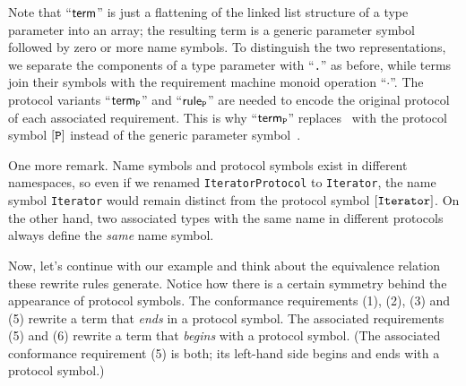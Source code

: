 \documentclass[../generics]{subfiles}
\begin{document}
\begin{example}
Note that ``$\mathsf{term}$'' is just a flattening of the linked list structure of a type parameter into an array; the resulting term is a generic parameter symbol followed by zero or more name symbols. To distinguish the two representations, we separate the components of a type parameter with ``\texttt{.}'' as before, while terms join their symbols with the requirement machine \index{$\cdot$}monoid operation ``\;$\cdot$\;''. The protocol variants ``$\mathsf{term}_{\texttt{P}}$'' and ``$\mathsf{rule}_{\texttt{P}}$'' are needed to encode the original protocol of each associated requirement. This is why ``$\mathsf{term}_{\texttt{P}}$'' replaces \IndexSelf\tSelf\ with the protocol symbol $[\texttt{P}]$ instead of the generic parameter symbol~\rT.

One more remark. Name symbols and protocol symbols exist in different namespaces, so even if we renamed \texttt{IteratorProtocol} to \texttt{Iterator}, the name symbol \texttt{Iterator} would remain distinct from the protocol symbol $[\texttt{Iterator}]$. On the other hand, two associated types with the same name in different protocols always define the \emph{same} name symbol.

Now, let's continue with our example and think about the equivalence relation these rewrite rules generate. Notice how there is a certain symmetry behind the appearance of protocol symbols. The conformance requirements (1), (2), (3) and (5) rewrite a term that \emph{ends} in a protocol symbol. The associated requirements (5) and (6) rewrite a term that \emph{begins} with a protocol symbol. (The associated conformance requirement (5) is both; its left-hand side begins and ends with a protocol symbol.)


\end{example}
\end{document}
